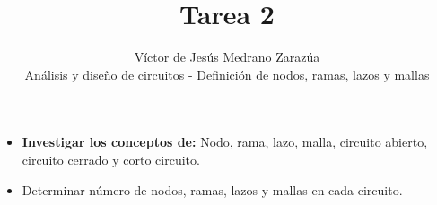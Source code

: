 \documentclass[12pt]{article}
\begin{document}
     
     
     
    \title{Tarea 2}%
    \author{Víctor de Jesús Medrano Zarazúa\\ %
    Análisis y diseño de circuitos - Definición de nodos, ramas, lazos y mallas} %
     
    \maketitle
    
    \begin{itemize}
        \item \textbf{Investigar los conceptos de: } Nodo, rama, lazo, malla, circuito abierto, circuito cerrado y corto circuito.
    
        \item Determinar número de nodos, ramas, lazos y mallas en cada circuito.
    
    \end{itemize}
    
     
    
\end{document}
